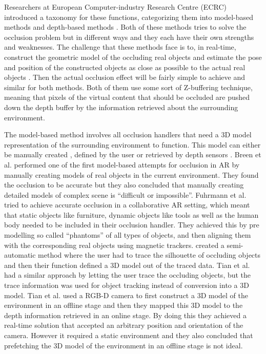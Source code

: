 Researchers at European Computer-industry Research Centre (ECRC) introduced a taxonomy for these functions, categorizing them into model-based methods and depth-based methods \cite{breen1996interactive}. Both of these methods tries to solve the occlusion problem but in different ways and they each have their own strengths and weaknesses. The challenge that these methods face is to, in real-time, construct the geometric model of the occluding real objects and estimate the pose and position of the constructed objects as close as possible to the actual real objects \cite{fortin2006handling}. Then the actual occlusion effect will be fairly simple to achieve and similar for both methods. Both of them use some sort of Z-buffering technique, meaning that pixels of the virtual content that should be occluded are pushed down the depth buffer by the information retrieved about the surrounding environment.

The model-based method involves all occlusion handlers that need a 3D model representation of the surrounding environment to function. This model can either be manually created \cite{breen1996interactive, fuhrmann1999occlusion}, defined by the user \cite{ong1998resolving, lepetit2000semi, tian2010real} or retrieved by depth sensors \cite{tian2015handling}. Breen et al. \cite{breen1996interactive} performed one of the first model-based attempts for occlusion in AR by manually creating models of real objects in the current environment. They found the occlusion to be accurate but they also concluded that manually creating detailed models of complex scene is ``difficult or impossible''. Fuhrmann et al. \cite{fuhrmann1999occlusion} tried to achieve accurate occlusion in a collaborative AR setting, which meant that static objects like furniture, dynamic objects like tools as well as the human body needed to be included in their occlusion handler. They achieved this by pre modelling so called ``phantoms'' of all types of objects, and then aligning them with the corresponding real objects using magnetic trackers. \cite{ong1998resolving, lepetit2000semi} created a semi-automatic method where the user had to trace the silhouette of occluding objects and then their function defined a 3D model out of the traced data.  Tian et al. \cite{tian2010real} had a similar approach by letting the user trace the occluding objects, but the trace information was used for object tracking instead of conversion into a 3D model. Tian et al. \cite{tian2015handling} used a RGB-D camera to first construct a 3D model of the environment in an offline stage and then they mapped this 3D model to the depth information retrieved in an online stage. By doing this they achieved a real-time solution that accepted an arbitrary position and orientation of the camera. However it required a static environment and they also concluded that prefetching the 3D model of the environment in an offline stage is not ideal. 


